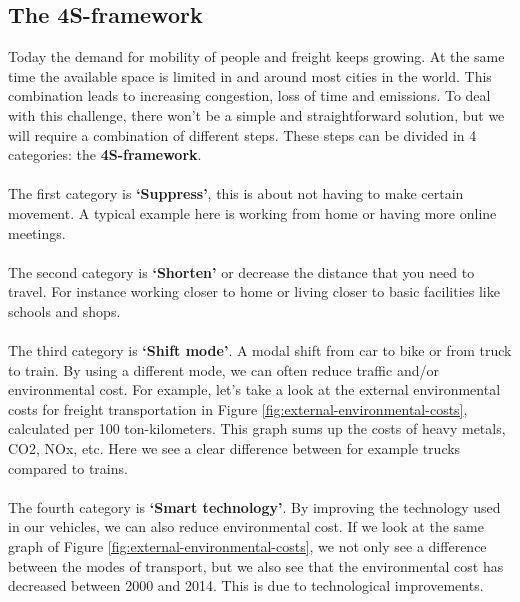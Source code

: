 \documentclass[../summary.tex]{subfiles}
\begin{document}
	\subsection{The 4S-framework}
	
	Today the demand for mobility of people and freight keeps growing. At the same time the available space is limited in and around most cities in the world. This combination leads to increasing congestion, loss of time and emissions. To deal with this challenge, there won't be a simple and straightforward solution, but we will require a combination of different steps. These steps can be divided in 4 categories: the \textbf{4S-framework}.
	\\\\
	The first category is \textbf{‘Suppress’}, this is about not having to make certain movement. A typical example here is working from home or having more online meetings.
	\\\\
	The second category is \textbf{‘Shorten’} or decrease the distance that you need to travel. For instance working closer to home or living closer to basic facilities like schools and shops.
	\\\\
	The third category is \textbf{‘Shift mode’}. A modal shift from car to bike or from truck to train. By using a different mode, we can often reduce traffic and/or environmental cost. For example, let’s take a look at the external environmental costs for freight transportation in Figure \ref{fig:external-environmental-costs}, calculated per 100 ton-kilometers. This graph sums up the costs of heavy metals, CO2, NOx, etc. Here we see a clear difference between for example trucks compared to trains.
	\\\\	
	The fourth category is \textbf{‘Smart technology’}. By improving the technology used in our vehicles, we can also reduce environmental cost. If we look at the same graph of Figure \ref{fig:external-environmental-costs}, we not only see a difference between the modes of transport, but we also see that the environmental cost has decreased between 2000 and 2014. This is due to technological improvements. 
	
\end{document}
